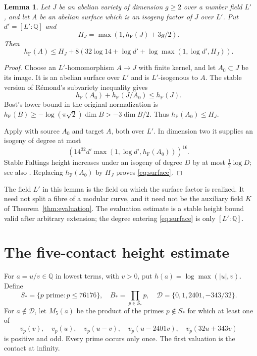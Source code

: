 \documentclass[11pt,a4paper]{article}
\newtheorem{lemma}[theorem]{Lemma}
\theoremstyle{definition}
\newcommand{\Q}{\mathbb Q}
\newcommand{\hF}{h_{\mathrm F}}
\begin{document}
\begin{lemma}\label{lem:surface}
Let $J$ be an abelian variety of dimension $g\ge2$ over a number
field $L'$, and let $A$ be an abelian surface which is an isogeny
factor of $J$ over $L'$. Put $d'=[L':\Q]$ and
\[
 H_J=\max(1,\hF(J)+3g/2).
\]
Then
\begin{equation}\label{eq:surface}
 \hF(A)\le H_J+
 8\left(32\log14+\log d'+
                \log\max(1,\log d',H_J)\right).
\end{equation}
\end{lemma}
\begin{proof}
Choose an $L'$-homomorphism $A\to J$ with finite kernel, and
let $A_0\subset J$ be its image. It is an abelian surface over
$L'$ and is $L'$-isogenous to $A$.
The stable version of R\'emond's subvariety inequality
\cite[Corollary~1.2 and the paragraph following Corollary~1.3]{Remond}
gives
\[
 \hF(A_0)+\hF(J/A_0)\le\hF(J).
\]
Bost's lower bound in the original normalization is
$\hF(B)\ge-\log(\pi\sqrt2)\dim B>-3\dim B/2$.
Thus $\hF(A_0)\le H_J$.

Apply \cite[Theorem~1.9(1)]{GaudronRemond} with source $A_0$
and target $A$, both over $L'$. In dimension two it supplies an
isogeny of degree at most
\[
 \left(14^{32}d'\max(1,\log d',\hF(A_0))\right)^{16}.
\]
Stable Faltings height increases under an isogeny of degree $D$
by at most $\frac12\log D$; see also
\cite[Proposition~2.1]{Remond}. Replacing $\hF(A_0)$ by $H_J$
proves \eqref{eq:surface}.
\end{proof}

The field $L'$ in this lemma is the field on which the surface
factor is realized. It need not split a fibre of a modular curve,
and it need not be the auxiliary field $K$ of
Theorem~\ref{thm:evaluation}. The evaluation estimate is a stable
height bound valid after arbitrary extension; the degree entering
\eqref{eq:surface} is only $[L':\Q]$.

\section{The five-contact height estimate}

For $a=u/v\in\Q$ in lowest terms, with $v>0$, put
$h(a)=\log\max(|u|,v)$. Define
\[
 S_*=\{p\text{ prime}:p\le76176\},\quad
 B_*=\prod_{p\in S_*}p,\quad
 \mathcal D=\{0,1,2401,-343/32\}.
\]
For $a\notin\mathcal D$, let $M_5(a)$ be the product of the
primes $p\notin S_*$ for which at least one of
\[
 v_p(v),\quad v_p(u),\quad v_p(u-v),\quad
 v_p(u-2401v),\quad v_p(32u+343v)
\]
is positive and odd. Every prime occurs only once.
The first valuation is the contact at infinity.
\end{document}

